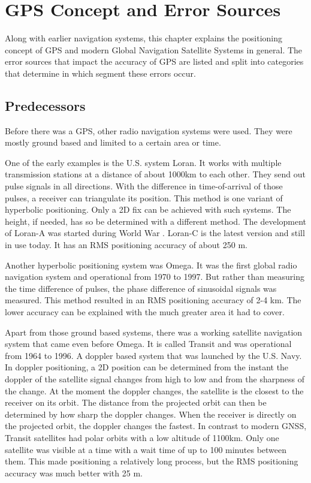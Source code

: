 \chapter{GPS Concept and Error Sources}\label{ch:GPS_concept}

Along with earlier navigation systems, this chapter explains the positioning concept of GPS and modern Global Navigation Satellite Systems in general.
The error sources that impact the accuracy of GPS are listed and split into categories that determine in which segment these errors occur.


\section{Predecessors}
Before there was a GPS, other radio navigation systems were used.
They were mostly ground based and limited to a certain area or time.

One of the early examples is the U.S. system Loran.
It works with multiple transmission stations at a distance of about 1000km to each other.
They send out pulse signals in all directions.
With the difference in time-of-arrival of those pulses, a receiver can triangulate its position.
This method is one variant of hyperbolic positioning.
Only a 2D fix can be achieved with such systems.
The height, if needed, has so be determined with a different method.
The development of Loran-A was started during World War .
Loran-C is the latest version and still in use today.
It has an RMS positioning accuracy of about 250 m.

Another hyperbolic positioning system was Omega.
It was the first global radio navigation system and operational from 1970 to 1997.
But rather than measuring the time difference of pulses, the phase difference of sinusoidal signals was measured.
This method resulted in an RMS positioning accuracy of 2-4 km.
The lower accuracy can be explained with the much greater area it had to cover.

Apart from those ground based systems, there was a working satellite navigation system that came even before Omega.
It is called Transit and was operational from 1964 to 1996.
A doppler based system that was launched by the U.S. Navy.
In doppler positioning, a 2D position can be determined from the instant the doppler of the satellite signal changes from high to low and from the sharpness of the change.
At the moment the doppler changes, the satellite is the closest to the receiver on its orbit.
The distance from the projected orbit can then be determined by how sharp the doppler changes.
When the receiver is directly on the projected orbit, the doppler changes the fastest.
In contrast to modern GNSS, Transit satellites had polar orbits with a low altitude of 1100km.
Only one satellite was visible at a time with a wait time of up to 100 minutes between them.
This made positioning a relatively long process, but the RMS positioning accuracy was much better with 25 m.

